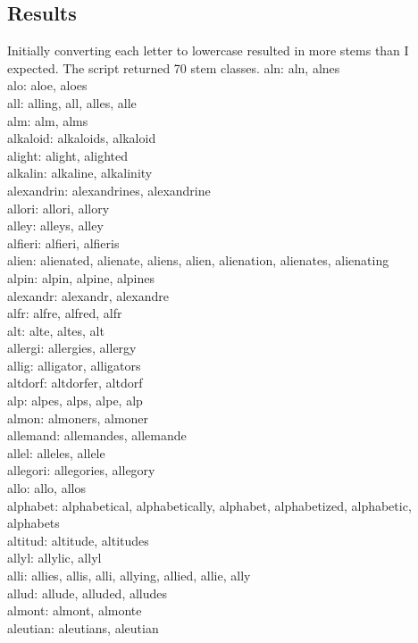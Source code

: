 \documentclass[10pt,letterpaper,bibliography=totoc]{scrartcl}
\begin{document}
\subsection{Results}
Initially converting each letter to lowercase resulted in more stems than I expected. The script returned 70 stem classes.
\noindent
aln: aln, alnes\\
alo: aloe, aloes\\
all: alling, all, alles, alle\\
alm: alm, alms\\
alkaloid: alkaloids, alkaloid\\
alight: alight, alighted\\
alkalin: alkaline, alkalinity\\
alexandrin: alexandrines, alexandrine\\
allori: allori, allory\\
alley: alleys, alley\\
alfieri: alfieri, alfieris\\
alien: alienated, alienate, aliens, alien, alienation, alienates, alienating\\
alpin: alpin, alpine, alpines\\
alexandr: alexandr, alexandre\\
alfr: alfre, alfred, alfr\\
alt: alte, altes, alt\\
allergi: allergies, allergy\\
allig: alligator, alligators\\
altdorf: altdorfer, altdorf\\
alp: alpes, alps, alpe, alp\\
almon: almoners, almoner\\
allemand: allemandes, allemande\\
allel: alleles, allele\\
allegori: allegories, allegory\\
allo: allo, allos\\
alphabet: alphabetical, alphabetically, alphabet, alphabetized, alphabetic, alphabets\\
altitud: altitude, altitudes\\
allyl: allylic, allyl\\
alli: allies, allis, alli, allying, allied, allie, ally\\
allud: allude, alluded, alludes\\
almont: almont, almonte\\
aleutian: aleutians, aleutian\\
\end{document}
